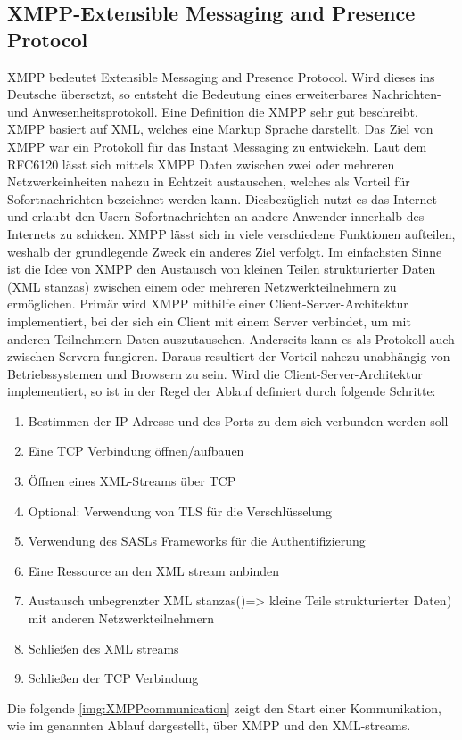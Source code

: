 \documentclass[a4paper,titlepage,halfparskip,12pt]{scrreprt}
\begin{document}
\begin{onehalfspacing}
\section{XMPP-Extensible Messaging and Presence Protocol}
\label{sec:XMPP}
\ac{XMPP} bedeutet Extensible Messaging and Presence Protocol. Wird dieses ins Deutsche übersetzt, so entsteht die Bedeutung eines erweiterbares Nachrichten- und Anwesenheitsprotokoll. Eine Definition die \ac{XMPP} sehr gut beschreibt. \ac{XMPP} basiert auf \ac{XML}, welches eine Markup Sprache darstellt. Das Ziel von \ac{XMPP} war ein Protokoll für das Instant Messaging zu entwickeln. Laut dem RFC6120 lässt sich mittels \ac{XMPP} Daten zwischen zwei oder mehreren Netzwerkeinheiten nahezu in Echtzeit austauschen, welches als Vorteil für Sofortnachrichten bezeichnet werden kann. Diesbezüglich nutzt es das Internet und erlaubt den Usern Sofortnachrichten an andere Anwender innerhalb des Internets zu schicken. \ac{XMPP} lässt sich in viele verschiedene Funktionen aufteilen, weshalb der grundlegende Zweck ein anderes Ziel verfolgt. Im einfachsten Sinne ist die Idee von \ac{XMPP} den Austausch von kleinen Teilen strukturierter Daten (\glqq \ac{XML} stanzas\grqq) zwischen einem oder mehreren Netzwerkteilnehmern zu ermöglichen. Primär wird \ac{XMPP} mithilfe einer Client-Server-Architektur implementiert, bei der sich ein Client mit einem Server verbindet, um mit anderen Teilnehmern Daten auszutauschen. Anderseits kann es als Protokoll auch zwischen Servern fungieren. Daraus resultiert der Vorteil nahezu unabhängig von Betriebssystemen und Browsern zu sein. Wird die Client-Server-Architektur implementiert, so ist in der Regel der Ablauf definiert durch folgende Schritte: \cite{RFC6120} 
\begin{enumerate}
	\item Bestimmen der IP-Adresse und des Ports zu dem sich verbunden werden soll 
	\item Eine \ac{TCP} Verbindung öffnen/aufbauen
	\item Öffnen eines \ac{XML}-Streams über \ac{TCP}
	\item Optional: Verwendung von \ac{TLS} für die Verschlüsselung
	\item Verwendung des SASLs Frameworks für die Authentifizierung
	\item Eine Ressource an den \ac{XML} stream anbinden
	\item Austausch unbegrenzter \glqq \ac{XML} stanzas\grqq ()=> kleine Teile strukturierter Daten) mit anderen Netzwerkteilnehmern
	\item Schließen des \ac{XML} streams
	\item Schließen der \ac{TCP} Verbindung
\end{enumerate}
Die folgende \autoref{img:XMPPcommunication} zeigt den Start einer Kommunikation, wie im genannten Ablauf dargestellt, über \ac{XMPP} und den \ac{XML}-streams.


\end{onehalfspacing}
\end{document}
